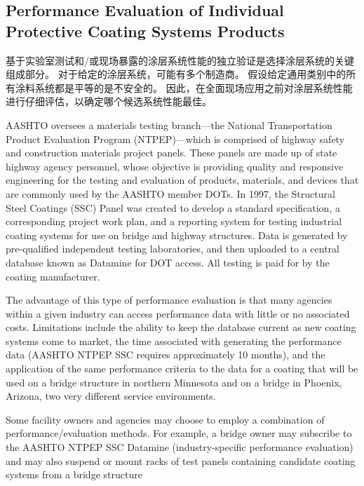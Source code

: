 \subsection{Performance Evaluation of Individual Protective Coating Systems Products}
\label{subsec:evaluation-protective-coating}
基于实验室测试和/或现场暴露的涂层系统性能的独立验证是选择涂层系统的关键组成部分。 对于给定的涂层系统，可能有多个制造商。 假设给定通用类别中的所有涂料系统都是平等的是不安全的。 因此，在全面现场应用之前对涂层系统性能进行仔细评估，以确定哪个候选系统性能最佳。

AASHTO oversees a materials testing branch—the National Transportation Product Evaluation Program
(NTPEP)—which is comprised of highway safety and construction materials project panels. These panels are made
up of state highway agency personnel, whose objective is providing quality and responsive engineering for the testing
and evaluation of products, materials, and devices that are commonly used by the AASHTO member DOTs. In 1997,
the Structural Steel Coatings (SSC) Panel was created to develop a standard specification, a corresponding project
work plan, and a reporting system for testing industrial coating systems for use on bridge and highway structures. Data is generated by pre-qualified independent testing laboratories, and then uploaded to a central database known as
Datamine for DOT access. All testing is paid for by the coating manufacturer.

The advantage of this type of performance evaluation is that many agencies within a given industry can access
performance data with little or no associated costs. Limitations include the ability to keep the database current as new
coating systems come to market, the time associated with generating the performance data (AASHTO NTPEP SSC
requires approximately 10 months), and the application of the same performance criteria to the data for a coating that
will be used on a bridge structure in northern Minnesota and on a bridge in Phoenix, Arizona, two very different
service environments.

Some facility owners and agencies may choose to employ a combination of performance/evaluation methods. For
example, a bridge owner may subscribe to the AASHTO NTPEP SSC Datamine (industry-specific performance
evaluation) and may also suspend or mount racks of test panels containing candidate coating systems from a bridge
structure